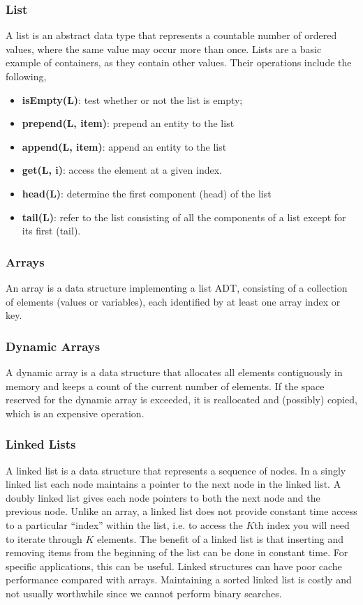 \documentclass{article}
\begin{document}
    \subsubsection{List}
    A list is an abstract data type that represents a countable number of ordered values, where the same value may occur more than once. Lists are a basic example of containers, as they contain other values. Their operations include the following,
    \begin{itemize}
        \item \textbf{isEmpty(L)}: test whether or not the list is empty;
        \item \textbf{prepend(L, item)}: prepend an entity to the list
        \item \textbf{append(L, item)}: append an entity to the list
        \item \textbf{get(L, i)}: access the element at a given index.
        \item \textbf{head(L)}: determine the first component (head) of the list
        \item \textbf{tail(L)}: refer to the list consisting of all the components of a list except for its first (tail).
    \end{itemize}
    
    \subsubsection{Arrays}
    An array is a data structure implementing a list ADT, consisting of a collection of elements (values or variables), each identified by at least one array index or key.
    
    \subsubsection{Dynamic Arrays}
    A dynamic array is a data structure that allocates all elements contiguously in memory and keeps a count of the current number of elements. If the space reserved for the dynamic array is exceeded, it is reallocated and (possibly) copied, which is an expensive operation.
    
    \subsubsection{Linked Lists}
    A linked list is a data structure that represents a sequence of nodes. In a singly linked list each node maintains a pointer to the next node in the linked list. A doubly linked list gives each node pointers to both the next node and the previous node. Unlike an array, a linked list does not provide constant time access to a particular ``index'' within the list, i.e. to access the $K$th index you will need to iterate through $K$ elements. The benefit of a linked list is that inserting and removing items from the beginning of the list can be done in constant time. For specific applications, this can be useful. Linked structures can have poor cache performance compared with arrays. Maintaining a sorted linked list is costly and not usually worthwhile since we cannot perform binary searches.
\end{document}
